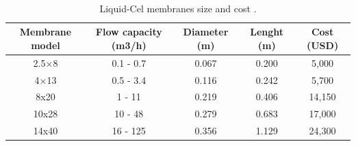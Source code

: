 \begin{refsection}[referencesCh6]

\begin{table}[h] 
\centering
\caption{Liquid-Cel\textsuperscript{\texttrademark} membranes size and cost \protect\citep{LiquidCelData, SGProjects, DPCWaterSolutions}.} \label{table:LiquidCelData}
\begin{tabular}{@{}ccccc@{}}
	\toprule
	Membrane model & Flow capacity (m3/h) & Diameter (m) & Lenght (m) & Cost (USD) \\ \midrule
	2.5×8          & 0.1 - 0.7            & 0.067        & 0.200      & 5,000       \\
	4×13           & 0.5 - 3.4            & 0.116        & 0.242      & 5,700       \\
	8x20           & 1 - 11               & 0.219        & 0.406      & 14,150      \\
	10x28          & 10 - 48              & 0.279        & 0.683      & 17,000      \\
	14x40          & 16 - 125             & 0.356        & 1.129      & 24,300      \\ \bottomrule
\end{tabular}
\end{table}


\end{refsection}
